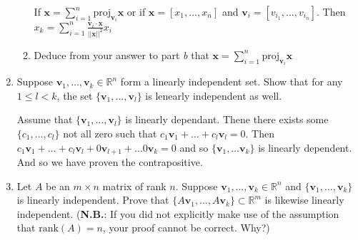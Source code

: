 \documentclass[letterpaper]{article}
\newcommand{\proj}{\text{proj}}
\begin{document}
\begin{enumerate}
\begin{enumerate}
  If $\mathbf{x}=\sum\limits_{i=1}^n{\proj_{\mathbf{v}_i}\mathbf{x}}$ or if $\mathbf{x}=[x_1,\dots,x_n]$ and $\mathbf{v}_i=[v_{i_1},\dots,v_{i_n}]$. Then $x_k=\sum\limits_{i=1}^n{\frac{\mathbf{v}_i\cdot\mathbf{x}}{||\mathbf{x}||^2}x_i}$
  \item
  Deduce from your answer to part \emph{b} that $\mathbf{x}=\sum\limits_{i=1}^n{\proj_{\mathbf{v}_i}\mathbf{x}}$
  \end{enumerate}
\setcounter{enumi}{13}
\item
Suppose $\mathbf{v}_1,\dots,\mathbf{v}_k\in \mathbb{R}^n$ form a linearly independent set. Show that for any $1\le l<k$, the set $\{\mathbf{v}_1,\dots,\mathbf{v}_l\}$ is lenearly  independent as well.

Assume that $\{\mathbf{v}_1,\dots,\mathbf{v}_l\}$ is linearly dependant. Thene there exists some $\{c_1,\dots,c_l\}$ not all zero such that $c_1\mathbf{v}_1+\dots+c_l\mathbf{v}_l=0$. Then $c_1\mathbf{v}_1+\dots+c_l\mathbf{v}_l+0\mathbf{v}_{l+1}+\dots0\mathbf{v}_k=0$ and so $\{\mathbf{v}_1,\dots\mathbf{v}_k\}$ is linearly dependent. And so we have proven the contrapositive.
\setcounter{enumi}{20}
\item
Let $A$ be an $m\times n$ matrix of rank $n$. Suppose $\mathbf{v}_1,\dots,\mathbf{v}_k\in \mathbb{R}^n$ and $\{\mathbf{v}_1,\dots,\mathbf{v}_k\}$ is linearly independent. Prove that $\{A\mathbf{v}_1,\dots,A\mathbf{v}_k\}\subset\mathbb{R}^m$ is likewise linearly independent. ({\bfseries N.B.}: If you did not explicitly make use of the assumption that $\text{rank}(A)=n$, your proof cannot be correct. Why?)
\end{enumerate}
\end{document}
